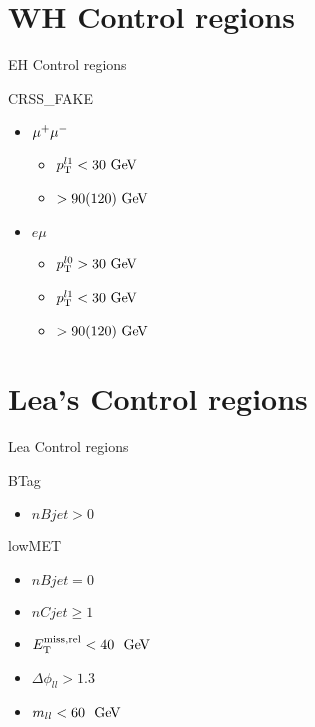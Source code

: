 \documentclass[10pt]{beamer}
\begin{document}
\section{WH Control regions}
\begin{frame}{EH Control regions}

  \begin{block}{CRSS\_FAKE}
    \begin{itemize}    
    \item $\mathrm{\mu^+ \mu^-}$
      \begin{itemize}
      \item $\pT^{l1}<30\GeV$
      \item \mljj$>90(120)\GeV$
      \end{itemize}
    \item $e\mu$
      \begin{itemize}
      \item $\pT^{l0}>30\GeV$
      \item $\pT^{l1}<30\GeV$
      \item \mljj$>90(120)\GeV$
      \end{itemize}
    \end{itemize}
  \end{block}

\end{frame}


\section{Lea's Control regions}
\begin{frame}{Lea Control regions}

  \begin{block}{BTag}
    \begin{itemize}    
    \item $nBjet>0$
    \end{itemize}
  \end{block}
  
  \begin{block}{lowMET}
    \begin{itemize}    
    \item $nBjet=0$
    \item $nCjet\ge 1$
    \item $\METrel<40~\GeV$
    \item $\Delta\phi_{ll}>1.3$
    \item $m_{ll}<60~\GeV$
    \end{itemize}
  \end{block}
 
\end{frame}
\end{document}
